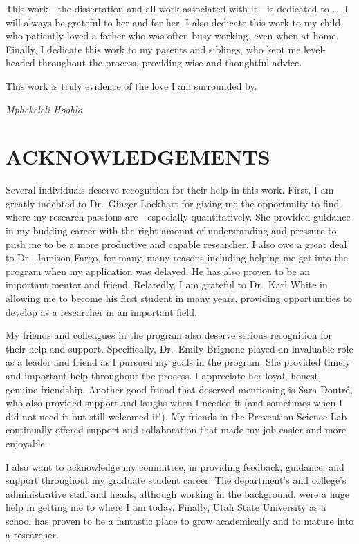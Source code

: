 \documentclass[]{DissertateUSU}
\begin{document}
This work---the dissertation and all work associated with it---is
dedicated to \ldots. I will always be grateful to her and for her. I
also dedicate this work to my child, who patiently loved a father who
was often busy working, even when at home. Finally, I dedicate this work
to my parents and siblings, who kept me level-headed throughout the
process, providing wise and thoughtful advice.

This work is truly evidence of the love I am surrounded by.

\hspace{10.5 cm} \emph{Mphekeleli Hoohlo}

\newpage

 \fancyhead[R]{\thepage} \fancyfoot[C]{}
\chapter*{ACKNOWLEDGEMENTS}

Several individuals deserve recognition for their help in this work.
First, I am greatly indebted to Dr.~Ginger Lockhart for giving me the
opportunity to find where my research passions are---especially
quantitatively. She provided guidance in my budding career with the
right amount of understanding and pressure to push me to be a more
productive and capable researcher. I also owe a great deal to
Dr.~Jamison Fargo, for many, many reasons including helping me get into
the program when my application was delayed. He has also proven to be an
important mentor and friend. Relatedly, I am grateful to Dr.~Karl White
in allowing me to become his first student in many years, providing
opportunities to develop as a researcher in an important field.

My friends and colleagues in the program also deserve serious
recognition for their help and support. Specifically, Dr.~Emily Brignone
played an invaluable role as a leader and friend as I pursued my goals
in the program. She provided timely and important help throughout the
process. I appreciate her loyal, honest, genuine friendship. Another
good friend that deserved mentioning is Sara Doutré, who also provided
support and laughs when I needed it (and sometimes when I did not need
it but still welcomed it!). My friends in the Prevention Science Lab
continually offered support and collaboration that made my job easier
and more enjoyable.

I also want to acknowledge my committee, in providing feedback,
guidance, and support throughout my graduate student career. The
department's and college's administrative staff and heads, although
working in the background, were a huge help in getting me to where I am
today. Finally, Utah State University as a school has proven to be a
fantastic place to grow academically and to mature into a researcher.
\end{document}
